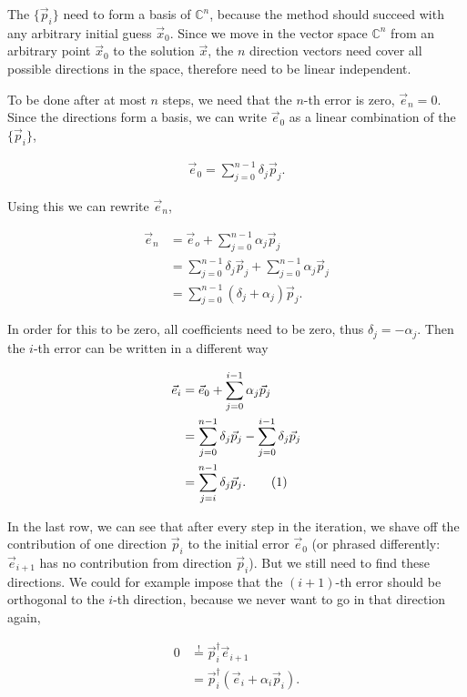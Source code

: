 \documentclass{article}
\newcommand\numberthis{\addtocounter{equation}{1}\tag{\theequation}}
\theoremstyle{plain} %
\theoremstyle{convention} %
\theoremstyle{remark} %
\numberwithin{equation}{section}
\begin{document}
The $\{\vec{p}_i\}$ need to form a basis of $\mathbb{C}^n$, because the method should succeed with any arbitrary initial guess $\vec{x}_0$. Since we move in the vector space $\mathbb{C}^n$ from an arbitrary point $\vec{x}_0$ to the solution $\vec{x}$, the $n$ direction vectors need cover all possible directions in the space, therefore need to be linear independent.

To be done after at most $n$ steps, we need that the $n$-th error is zero, $\vec{e}_n = 0$. Since the directions form a basis, we can write $\vec{e}_0$ as a linear combination of the $\{\vec{p}_i\}$,

\begin{align*}
    \vec{e}_{0} = \sum_{j=0}^{n-1} \delta_j \vec{p}_j.
\end{align*}

Using this we can rewrite $\vec{e}_n$,

\begin{align*}
    \vec{e}_{n} &= \vec{e}_o + \sum_{j=0}^{n-1} \alpha_j \vec{p}_j \\
                &= \sum_{j=0}^{n-1} \delta_j \vec{p}_j + \sum_{j=0}^{n-1} \alpha_j \vec{p}_j \\
                &= \sum_{j=0}^{n-1} (\delta_j + \alpha_j) \vec{p}_j.
\end{align*}

In order for this to be zero, all coefficients need to be zero, thus $\delta_j = - \alpha_j$. Then the $i$-th error can be written in a different way

\begin{align*}
    \vec{e}_{i} &= \vec{e}_0 + \sum_{j=0}^{i-1} \alpha_j \vec{p}_j \\
                &= \sum_{j=0}^{n-1} \delta_j \vec{p}_j - \sum_{j=0}^{i-1} \delta_j \vec{p}_j \\
                &= \sum_{j=i}^{n-1} \delta_j \vec{p}_j. \numberthis \label{eq:error_i}
\end{align*}

In the last row, we can see that after every step in the iteration, we shave off the contribution of one direction $\vec{p}_i$ to the initial error $\vec{e}_0$ (or phrased differently: $\vec{e}_{i+1}$ has no contribution from direction $\vec{p}_i$). But we still need to find these directions. We could for example impose that the $(i+1)$-th error should be orthogonal to the $i$-th direction, because we never want to go in that direction again,

\begin{align*}
    0 &\stackrel{!}{=} \vec{p}_i^{\dagger} \vec{e}_{i+1} \\
                    &= \vec{p}_i^{\dagger} ( \vec{e}_{i} + \alpha_i \vec{p}_i ).
\end{align*}
\end{document}
